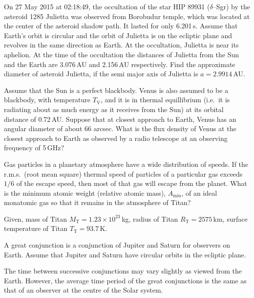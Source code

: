 On 27 May 2015 at 02:18:49, the occultation of the star HIP 89931
($\delta$--Sgr) by the asteroid 1285 Julietta was observed from Borobudur
temple, which was located at the center of the asteroid shadow path. It lasted
for only 6.201\,s. Assume that Earth's orbit is circular and the orbit of
Julietta is on the ecliptic plane and revolves in the same direction as Earth.
At the occultation, Julietta is near its aphelion. At the time of the
occultation the distances of Julietta from the Sun and the Earth are
3.076\,AU and 2.156\,AU respectively. Find the approximate diameter of asteroid
Julietta, if the semi major axis of Julietta is $a = 2.9914$\,AU.

Assume that the Sun is a perfect blackbody. Venus is also assumed to be a
blackbody, with temperature $T_{\mathrm{V}}$, and it is in thermal equillibrium
(i.e.\ it is radiating about as much energy as it receives from the Sun) at its
orbital distance of 0.72\,AU. Suppose that at closest approach to Earth, Venus
has an angular diameter of about 66 arcsec. What is the flux density of Venus
at the closest approach to Earth as observed by a radio telescope at an
observing frequency of 5\,GHz?

Gas particles in a planetary atmosphere have a wide distribution of speeds. If
the r.m.s.\ (root mean square) thermal speed of particles of a particular gas
exceeds $1/6$ of the escape speed, then most of that gas will escape from the
planet. What is the minimum atomic weight (relative atomic mass),
$A_{\min}$, of an ideal monatomic gas so that it remains in the atmosphere of
Titan?

Given, mass of Titan $M_{\mathrm{T}} = 1.23 \times 10^{23}$\,kg, radius of
Titan $R_{\mathrm{T}} = 2575$\,km, surface temperature of Titan
$T_{\mathrm{T}} = 93.7$\,K.

A great conjunction is a conjunction of Jupiter and Saturn for observers on
Earth. Assume that Jupiter and Saturn have circular orbits in the ecliptic
plane.

The time between successive conjunctions may vary slightly as viewed from the
Earth. However, the average time period of the great conjunctions is the same
as that of an observer at the centre of the Solar system.

